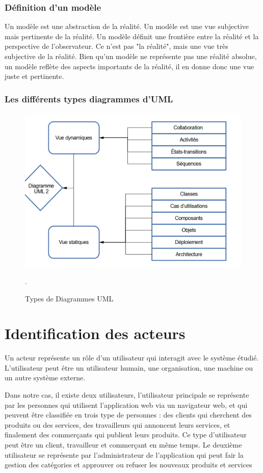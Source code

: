 \subsubsection{Définition d’un modèle }
\par Un modèle est une abstraction de la réalité. Un modèle est une vue
subjective mais pertinente de la réalité. Un modèle définit une frontière entre
la réalité et la perspective de l'observateur. Ce n'est pas "la réalité", mais
une vue très subjective de la réalité. Bien qu'un modèle ne représente pas une
réalité absolue, un modèle reflète des aspects importants de la réalité, il en
donne donc une vue juste et pertinente.
\subsubsection{Les différents types diagrammes d’UML}
\begin{figure}[H]
\centering
\includegraphics[height=8cm]{Figures/TypeDiagrammesUML.png}
\caption{Types de Diagrammes UML \cite{ref3}}.
\label{fig:my_label}
\end{figure}
\section{Identification des acteurs }
\par Un acteur représente un rôle d'un utilisateur qui interagit avec le
système étudié. L'utilisateur peut être un utilisateur humain, une
organisation, une machine ou un autre système externe.\cite{ref4}
\par Dans notre cas, il existe deux utilisateurs, l’utilisateur principale se
représente par les personnes qui utilisent l’application web via un navigateur
web, et qui peuvent être classifiée en trois type de personnes : des clients
qui cherchent des produits ou des services, des travailleurs qui annoncent
leurs services, et finalement des commerçants qui publient leurs produits. Ce
type d’utilisateur peut être un client, travailleur et commerçant en même
temps. Le deuxième utilisateur se représente par l’administrateur de
l’application qui peut fair la gestion des catégories et approuver ou refuser
les nouveaux produits et services
